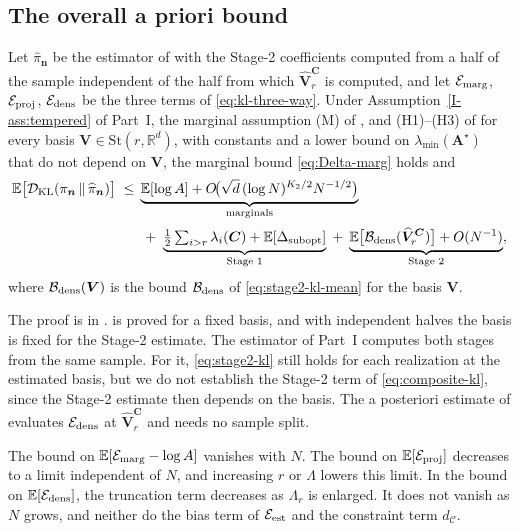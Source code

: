 \documentclass[review,hidelinks,onefignum,onetabnum]{siamart251216}
\newcommand{\RR}{\mathbb{R}}
\newcommand{\EE}{\mathbb{E}}
\newcommand{\DKL}{\mathcal{D}_{\mathrm{KL}}}
\newcommand{\mA}{\bm{A}}
\newcommand{\mC}{\bm{C}}
\newcommand{\mV}{\bm{V}}
\newcommand{\hmV}{\widehat{\bm{V}}}
\newcommand{\St}{\mathrm{St}}
\newcommand{\vn}{\bm{n}}
\begin{document}
\subsection{The overall a priori bound}
\label{sec:composite-kl}



\begin{proposition}
\label{prop:apriori-rates}
Let $\widehat\pi_{\vn}$ be the estimator of  with the Stage-2 coefficients computed from a half of the sample independent of the half from which $\hmV_r^{\mC}$ is computed, and let $\mathcal E_{\rm marg}$, $\mathcal E_{\rm proj}$, $\mathcal E_{\rm dens}$ be the three terms of \eqref{eq:kl-three-way}. Under Assumption~\ref{I-ass:tempered} of Part~I, the marginal assumption \textup{(M)} of , and \textup{(H1)}--\textup{(H3)} of  for every basis $\mV\in\St(r,\RR^d)$, with constants and a lower bound on $\lambda_{\min}(\mA^\star)$ that do not depend on $\mV$, the marginal bound \eqref{eq:Delta-marg} holds and
\begin{equation}
\begin{aligned}
  \EE\bigl[\DKL(\pi_{\vn}\,\|\,\widehat\pi_{\vn})\bigr]
  \;\le\;
  &\underbrace{\EE[\log A] + O\!\bigl(\sqrt d\,(\log N)^{K_2/2}N^{-1/2}\bigr)}_{\text{marginals}}
  \\[2pt]
  &\;+\;
  \underbrace{\tfrac12\textstyle\sum_{i>r}\lambda_i(\mC) + \EE[\Delta_{\rm subopt}]}_{\text{Stage 1}}
  \;+\;
  \underbrace{\EE\bigl[\mathcal B_{\rm dens}(\hmV_r^{\mC})\bigr] + O(N^{-1})}_{\text{Stage 2}},
\end{aligned}
  \label{eq:composite-kl}
\end{equation}
where $\mathcal B_{\rm dens}(\mV)$ is the bound $\mathcal B_{\rm dens}$ of \eqref{eq:stage2-kl-mean} for the basis $\mV$.
\end{proposition}

The proof is in .  is proved for a fixed basis, and with independent halves the basis is fixed for the Stage-2 estimate. The estimator of Part~I computes both stages from the same sample. For it, \eqref{eq:stage2-kl} still holds for each realization at the estimated basis, but we do not establish the Stage-2 term of \eqref{eq:composite-kl}, since the Stage-2 estimate then depends on the basis. The a posteriori estimate of  evaluates $\mathcal E_{\rm dens}$ at $\hmV_r^{\mC}$ and needs no sample split.

The bound on $\EE[\mathcal E_{\rm marg} - \log A]$ vanishes with $N$. The bound on $\EE[\mathcal E_{\rm proj}]$ decreases to a limit independent of $N$, and increasing $r$ or $\Lambda$ lowers this limit. In the bound on $\EE[\mathcal E_{\rm dens}]$, the truncation term decreases as $\Lambda_r$ is enlarged. It does not vanish as $N$ grows, and neither do the bias term of $\mathcal E_{\rm est}$ and the constraint term $d_{\mathcal C}$.
\end{document}
